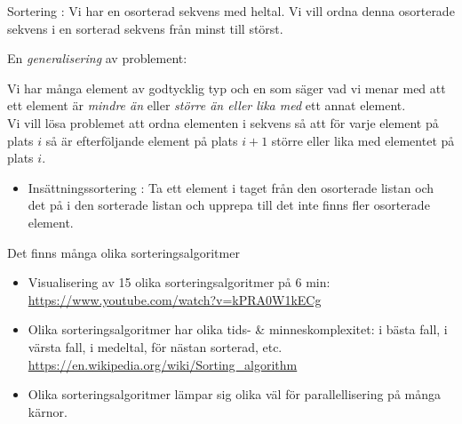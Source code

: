 \begin{Slide}{Sortering}
: Vi har en osorterad sekvens med heltal. Vi vill ordna denna osorterade sekvens i en sorterad sekvens från minst till störst.
\pause

\vspace{1em}\noindent
En \emph{generalisering} av problement: \\ \vspace{1em}

\noindent Vi har många element av godtycklig typ och en  som säger vad vi menar med att ett element är \emph{mindre än} eller \emph{större än eller lika med} ett annat element. \\ 

\vspace{1em}\noindent Vi vill lösa problemet att ordna elementen i sekvens så att för varje element på plats $i$ så är efterföljande element på plats $i + 1$ större eller lika med elementet på plats $i$.


\begin{itemize}
\item Insättningssortering : Ta ett element i taget från den osorterade listan och  det på  i den sorterade listan och upprepa till det inte finns fler osorterade element.
\end{itemize}
\end{Slide}

\begin{Slide}{Det finns många olika sorteringsalgoritmer}
\begin{itemize}
\item Visualisering av 15 olika sorteringsalgoritmer på 6 min:\\{\SlideFontSmall\url{https://www.youtube.com/watch?v=kPRA0W1kECg}}
\item Olika sorteringsalgoritmer har olika tids- \& minneskomplexitet: i bästa fall, i värsta fall, i medeltal, för nästan sorterad, etc.
\\{\SlideFontSmall\url{https://en.wikipedia.org/wiki/Sorting_algorithm}}
\item Olika sorteringsalgoritmer lämpar sig olika väl för parallellisering på många kärnor.
\end{itemize}
\end{Slide}


